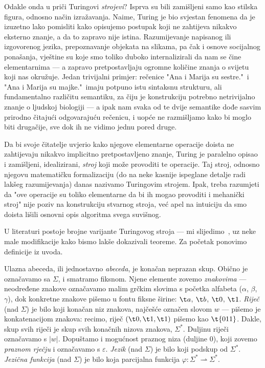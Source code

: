 Odakle onda u priči Turingovi \emph{strojevi}? Isprva su bili zamišljeni samo kao stilska figura, odnosno način izražavanja. Naime, Turing je bio svjestan fenomena da je izuzetno lako pomisliti kako opisujemo postupak koji ne zahtijeva nikakvo eksterno znanje, a da to zapravo nije istina. Razumijevanje napisanog ili izgovorenog jezika, prepoznavanje objekata na slikama, pa čak i osnove socijalnog ponašanja, vještine su koje smo toliko duboko internalizirali da nam se čine elementarnima --- a zapravo pretpostavljaju ogromne količine znanja o svijetu koji nas okružuje. Jedan trivijalni primjer: rečenice "Ana i Marija su sestre."\ i "Ana i Marija su majke."\ imaju potpuno istu sintaksnu strukturu, ali fundamentalno različitu semantiku, za čiju je konstrukciju potrebno netrivijalno znanje o ljudskoj biologiji --- a ipak nam svaka od te dvije semantike dođe sasvim prirodno čitajući odgovarajuću rečenicu, i uopće ne razmišljamo kako bi moglo biti drugačije, sve dok ih ne vidimo jednu pored druge.

Da bi svoje čitatelje uvjerio kako njegove elementarne operacije doista ne zahtijevaju nikakvo implicitno pretpostavljeno znanje, Turing je paralelno opisao i zamišljeni, idealizirani, \emph{stroj} koji može provoditi te operacije. Taj stroj, odnosno njegovu matematičku formalizaciju (do na neke kasnije ispeglane detalje radi lakšeg razumijevanja) danas nazivamo Turingovim strojem. Ipak, treba razumjeti da "ove operacije su toliko elementarne da bi ih mogao provoditi i mehanički stroj" nije poziv na konstrukciju stvarnog stroja, već apel na intuiciju da smo doista lišili osnovni opis algoritma svega suvišnog.

U literaturi postoje brojne varijante Turingovog stroja --- mi slijedimo~\cite{sipser}, uz neke male modifikacije kako bismo lakše dokazivali teoreme. Za početak ponovimo definicije iz uvoda.

Ulazna abeceda, ili jednostavno \emph{abeceda}, je konačan neprazan skup. Obično je označavamo sa $\Sigma$, i smatramo fiksnom. Njene elemente zovemo \emph{znakovima} --- ne\-od\-re\-đe\-ne znakove označavamo malim grčkim slovima s početka alfabeta ($\alpha$, $\beta$, $\gamma$), dok konkretne znakove pišemo u fontu fiksne širine: $\t a$, $\t b$, $\t 0$, $\t 1$. \emph{Riječ} (nad $\Sigma$) je bilo koji konačan niz znakova, najčešće označen slovom $w$ --- pišemo je konkatenacijom znakova: recimo, riječ $(\t0,\t1,\t1)$ pišemo kao $\t{011}$. Dakle, skup svih riječi je skup svih konačnih nizova znakova, $\Sigma^*$. Duljinu riječi označavamo s $\left|w\right|$. Dopuštamo i mogućnost praznog niza (duljine $0$), koji zovemo \emph{praznom rječju} i označavamo s $\varepsilon$. \emph{Jezik} (nad $\Sigma$) je bilo koji podskup od $\Sigma^*$. \emph{Jezična funkcija} (nad $\Sigma$) je bilo koja parcijalna funkcija $\varphi\colon\Sigma^*\rightharpoonup\Sigma^*$.

